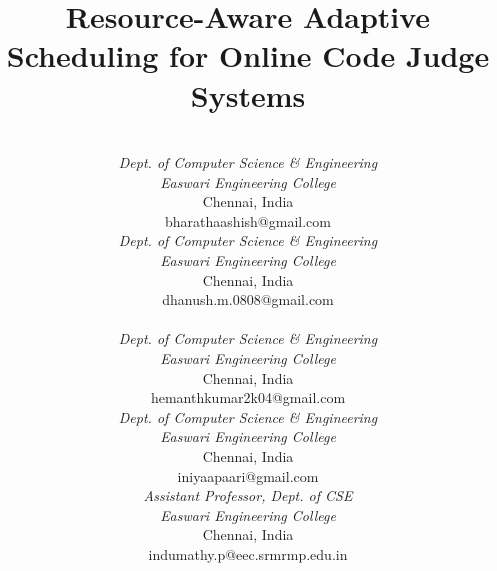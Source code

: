 \documentclass[conference]{IEEEtran}
\begin{document}
\title{Resource-Aware Adaptive Scheduling for Online Code Judge Systems}

\author{
\begin{tabular*}{\textwidth}{@{\extracolsep{\fill}}ccc@{}}
\begin{tabular}{c}
{\normalfont Bharath Aashish R}\\
{\itshape\small Dept. of Computer Science \& Engineering}\\
{\itshape\small Easwari Engineering College}\\
{\small Chennai, India}\\
{\small bharathaashish@gmail.com}
\end{tabular} & & \begin{tabular}{c}
{\normalfont Dhanush M}\\
{\itshape\small Dept. of Computer Science \& Engineering}\\
{\itshape\small Easwari Engineering College}\\
{\small Chennai, India}\\
{\small dhanush.m.0808@gmail.com}
\end{tabular}\\[1.4ex]
\begin{tabular}{c}
{\normalfont Hemanthkumar K}\\
{\itshape\small Dept. of Computer Science \& Engineering}\\
{\itshape\small Easwari Engineering College}\\
{\small Chennai, India}\\
{\small hemanthkumar2k04@gmail.com}
\end{tabular} & \begin{tabular}{c}
{\normalfont Iniyaa P}\\
{\itshape\small Dept. of Computer Science \& Engineering}\\
{\itshape\small Easwari Engineering College}\\
{\small Chennai, India}\\
{\small iniyaapaari@gmail.com}
\end{tabular} & \begin{tabular}{c}
{\normalfont Indumathy P}\\
{\itshape\small Assistant Professor, Dept. of CSE}\\
{\itshape\small Easwari Engineering College}\\
{\small Chennai, India}\\
{\small indumathy.p@eec.srmrmp.edu.in}
\end{tabular}\\
\end{tabular*}
}
\end{document}
